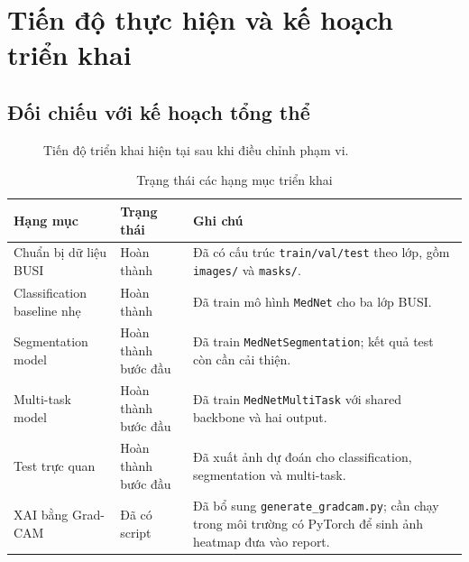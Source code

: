 \documentclass[12pt,a4paper]{article}
\begin{document}
\section{Tiến độ thực hiện và kế hoạch triển khai}

\subsection{Đối chiếu với kế hoạch tổng thể}

\begin{figure}[H]
\centering
{}
\caption{Tiến độ triển khai hiện tại sau khi điều chỉnh phạm vi.}
\end{figure}

\begin{table}[H]
\centering
\caption{Trạng thái các hạng mục triển khai}
\renewcommand{\arraystretch}{1.25}
\begin{tabular}{p{4.4cm} p{3.2cm} p{7.2cm}}
\toprule
\textbf{Hạng mục} & \textbf{Trạng thái} & \textbf{Ghi chú} \\
\midrule
Chuẩn bị dữ liệu BUSI & Hoàn thành & Đã có cấu trúc \texttt{train/val/test} theo lớp, gồm \texttt{images/} và \texttt{masks/}. \\
Classification baseline nhẹ & Hoàn thành & Đã train mô hình \texttt{MedNet} cho ba lớp BUSI. \\
Segmentation model & Hoàn thành bước đầu & Đã train \texttt{MedNetSegmentation}; kết quả test còn cần cải thiện. \\
Multi-task model & Hoàn thành bước đầu & Đã train \texttt{MedNetMultiTask} với shared backbone và hai output. \\
Test trực quan & Hoàn thành bước đầu & Đã xuất ảnh dự đoán cho classification, segmentation và multi-task. \\
XAI bằng Grad-CAM & Đã có script & Đã bổ sung \texttt{generate\_gradcam.py}; cần chạy trong môi trường có PyTorch để sinh ảnh heatmap đưa vào report. \\
\bottomrule
\end{tabular}
\end{table}
\end{document}
